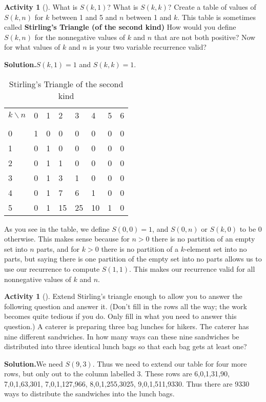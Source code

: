 \documentclass[10pt,]{book}
\newcommand{\terminology}[1]{\textbf{#1}}
\theoremstyle{plain}
\theoremstyle{definition}
\newtheorem{activity}[project]{Activity}
\numberwithin{equation}{chapter}
\newcommand{\hrulethin}  {\noalign{\hrule height 0.04em}}
\begin{document}
\begin{activity}[]\label{activity-125}
What is \(S(k,1)\)? What is \(S(k,k)\)? Create a table of values of \(S(k,n)\) for \(k\) between 1 and 5 and \(n\) between 1 and \(k\). This table is sometimes called \terminology{Stirling's Triangle (of the second kind)} How would you define \(S(k,n)\) for the nonnegative values of \(k\) and \(n\) that are not both positive? Now for what values of \(k\) and \(n\) is your two variable recurrence valid?%
\par\medskip\noindent%
\textbf{Solution.}\quad \(S(k,1)=1\) and \(S(k,k)=1\).%
\begin{table}
\centering
\begin{tabular}{llllllll}
\(k\backslash n\)&0&1&2&3&4&5&6\tabularnewline[0pt]
&&&&&&&\tabularnewline\hrulethin
0&1&0&0&0&0&0&0\tabularnewline[0pt]
1&0&1&0&0&0&0&0\tabularnewline[0pt]
2&0&1&1&0&0&0&0\tabularnewline[0pt]
3&0&1&3&1&0&0&0\tabularnewline[0pt]
4&0&1&7&6&1&0&0\tabularnewline[0pt]
5&0&1&15&25&10&1&0
\end{tabular}
\caption{Stirling's Triangle of the second kind\label{stirling-triangle-second}}
\end{table}
As you see in the table, we define \(S(0,0)=1\), and \(S(0,n)\) or \(S(k,0)\) to be 0 otherwise. This makes sense because for \(n>0\) there is no partition of an empty set into \(n\) parts, and for \(k>0\) there is no partition of a \(k\)-element set into no parts, but saying there is one partition of the empty set into no parts allows us to use our recurrence to compute \(S(1,1)\).  This makes our recurrence valid for all nonnegative values of \(k\) and \(n\).%
\end{activity}
\begin{activity}[]\label{sandwiches}
Extend Stirling's triangle enough to allow you to answer the following question and answer it. (Don't fill in the rows all the way; the work becomes quite tedious if you do. Only fill in what you need to answer this question.) A caterer is preparing three bag lunches for hikers. The caterer has nine different sandwiches. In how many ways can these nine sandwiches be distributed into three identical lunch bags so that each bag gets at least one?%
\par\medskip\noindent%
\textbf{Solution.}\quad We need \(S(9,3)\). Thus we need to extend our table for four more rows, but only out to the column labelled 3. These rows are 6,0,1,31,90, 7,0,1,63,301, 7,0,1,127,966, 8,0,1,255,3025, 9,0,1,511,9330. Thus there are 9330 ways to distribute the sandwiches into the lunch bags.%
\end{activity}
\end{document}
